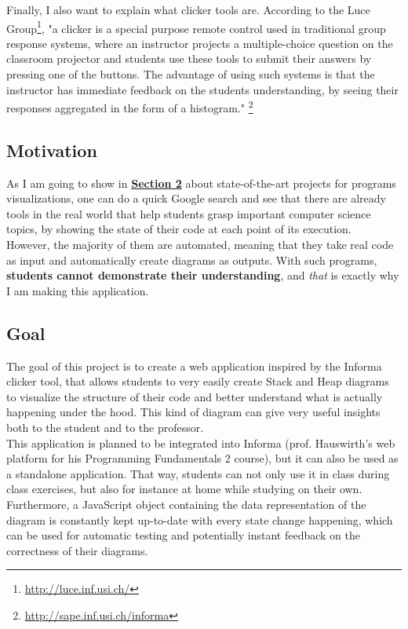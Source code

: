 \documentclass[]{usiinfbachelorproject}
\begin{document}
\vspace{\fill}
\pagebreak
 
\noindent Finally, I also want to explain what clicker tools are. According to the Luce Group\footnote{\url{http://luce.inf.usi.ch/}}, "a clicker is a special purpose remote control used in traditional group response systems, where an instructor projects a multiple-choice question on the classroom projector and students use these tools to submit their answers by pressing one of the buttons. The advantage of using such systems is that the instructor has immediate feedback on the students understanding, by seeing their responses aggregated in the form of a histogram." \footnote{\url{http://sape.inf.usi.ch/informa}}
 
\subsection{Motivation}

As I am going to show in \hyperref[state]{\textbf{Section 2}} about state-of-the-art projects for programs visualizations, one can do a quick Google search and see that there are already tools in the real world that help students grasp important computer science topics, by showing the state of their code at each point of its execution.\\
However, the majority of them are automated, meaning that they take real code as input and automatically create diagrams as outputs. With such programs, \textbf{students cannot demonstrate their understanding}, and \emph{that} is exactly why I am making this application.

\subsection{Goal} \label{goal}

The goal of this project is to create a web application inspired by the Informa clicker tool, that allows students to very easily create Stack and Heap diagrams to visualize the structure of their code and better understand what is actually happening under the hood. This kind of diagram can give very useful insights both to the student and to the professor.\\ This application is planned to be integrated into Informa (prof. Hauswirth's web platform for his Programming Fundamentals 2 course), but it can also be used as a standalone application. That way, students can not only use it in class during class exercises, but also for instance at home while studying on their own.\\
Furthermore, a JavaScript object containing the data representation of the diagram is constantly kept up-to-date with every state change happening, which can be used for automatic testing and potentially instant feedback on the correctness of their diagrams.
\end{document}
